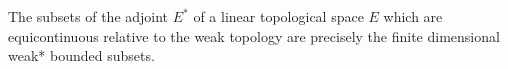 The subsets of the adjoint $E^*$ of a linear topological space $E$ which are equicontinuous relative to the weak topology are precisely the finite dimensional weak* bounded subsets.
